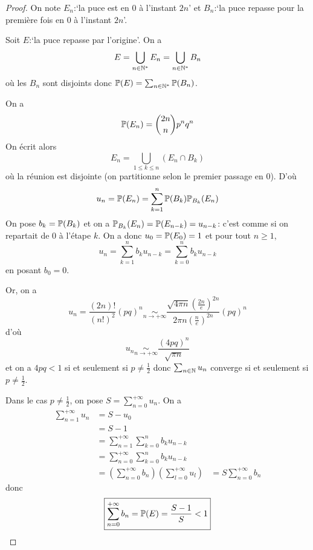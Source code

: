 \documentclass[12pt]{article}
\begin{document}
\begin{proof}
    On note $E_{n}$:`la puce est en $0$ à l'instant $2n$' et $B_{n}$:`la puce repasse pour la première fois en $0$ à l'instant $2n$'.

    Soit $E$:`la puce repasse par l'origine'. On a 
    \begin{equation}
        E=\bigcup_{n\in\N^{*}}E_{n}=\bigcup_{n\in\N^{*}}B_{n}
    \end{equation}
    où les $B_{n}$ sont disjoints donc $\P(E)=\sum_{n\in\N^{*}}\P(B_{n})$.

    On a 
    \begin{equation}
        \P(E_{n})=\binom{2n}{n}p^{n}q^{n} 
    \end{equation}
    On écrit alors 
    \begin{equation}
        E_{n}=\bigcup_{1\leqslant k\leqslant n}\left(E_{n}\cap B_{k}\right)
    \end{equation}
    où la réunion est disjointe (on partitionne selon le premier passage en 0). D'où 
    \begin{equation}
        u_{n}=\P(E_{n})=\sum_{k=1}^{n}\P(B_{k})\P_{B_{k}}(E_{n})
    \end{equation}
    On pose $b_{k}=\P(B_{k})$ et on a $\P_{B_{k}}(E_{n})=\P(E_{n-k})=u_{n-k}$: c'est comme si on repartait de 0 à l'étape $k$. On a donc $u_{0}=\P(E_{0})=1$ et pour tout $n\geqslant1$,
    \begin{equation}
        u_{n}=\sum_{k=1}^{n}b_{k}u_{n-k}=\sum_{k=0}^{n}b_{k}u_{n-k}
    \end{equation}
    en posant $b_{0}=0$.

    Or, on a 
    \begin{equation}
        u_{n}=\frac{(2n)!}{(n!)^{2}}(pq)^{n}\underset{n\to+\infty}{\sim}\frac{\sqrt{4\pi n}\left(\frac{2n}{e}\right)^{2n}}{2\pi n\left(\frac{n}{e}\right)^{2n}}(pq)^{n}
    \end{equation}
    d'où 
    \begin{equation}
        u_{n}\underset{n\to+\infty}{\sim}\frac{(4pq)^{n}}{\sqrt{\pi n}}
    \end{equation}
    et on a $4pq<1$ si et seulement si $p\neq\frac{1}{2}$ donc $\sum_{n\in\N}u_{n}$ converge si et seulement si $p\neq\frac{1}{2}$.

    Dans le cas $p\neq\frac{1}{2}$, on pose $S=\sum_{n=0}^{+\infty}u_{n}$. On a 
    \begin{align}
        \sum_{n=1}^{+\infty}u_{n}
        &=S-u_{0}\\
        &=S-1\\
        &=\sum_{n=1}^{+\infty}\sum_{k=0}^{n}b_{k}u_{n-k}\\
        &=\sum_{n=0}^{+\infty}\sum_{k=0}^{n}b_{k}u_{n-k}\\
        &=\left(\sum_{n=0}^{+\infty}b_{n}\right)\left(\sum_{l=0}^{+\infty}u_{l}\right)
        &=S\sum_{n=0}^{+\infty}b_{n}
    \end{align}
    donc 
    \begin{equation}
        \boxed{\sum_{n=0}^{+\infty}b_{n}=\P(E)=\frac{S-1}{S}<1}
    \end{equation}


\end{proof}
\end{document}
